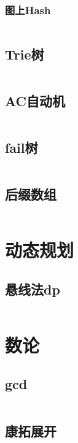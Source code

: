 \documentclass[a4paper,11pt]{article}
\begin{document}
\subsubsection{图上Hash} %
\inputminted[breaklines]{c++}{字符串/图上Hash.cpp} 

\subsection{Trie树} %
\inputminted[breaklines]{c++}{字符串/Trie树.cpp} 

\subsection{AC自动机} %
\inputminted[breaklines]{c++}{字符串/AC自动机.cpp} 

\subsection{fail树} %
\inputminted[breaklines]{c++}{字符串/fail树.cpp} 

\subsection{后缀数组} %
\inputminted[breaklines]{c++}{字符串/后缀数组.cpp} 

\section{动态规划} %
\subsection{悬线法dp} %
\inputminted[breaklines]{c++}{动态规划/悬线法dp.cpp} %

\section{数论} %

\subsection{gcd} %
\inputminted[breaklines]{c++}{数论/gcd.cpp} %

\subsection{康拓展开} %
\inputminted[breaklines]{c++}{数论/康拓展开.cpp} %
\end{document}
